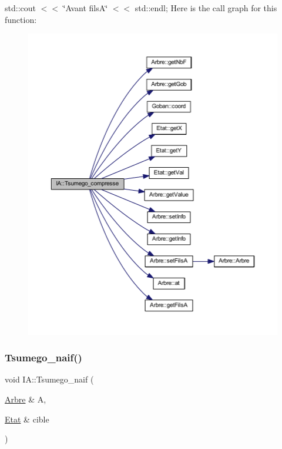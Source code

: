 std\+::cout $<$$<$ \char`\"{}\+Avant fils\+A\char`\"{} $<$$<$ std\+::endl; Here is the call graph for this function\+:
\nopagebreak
\begin{figure}[H]
\begin{center}
\leavevmode
\includegraphics[width=350pt]{class_i_a_a5d86a3548f2410f7fc0676b89d07f4fd_cgraph}
\end{center}
\end{figure}
\mbox{\label{class_i_a_a42202360406fe67babfd01a9b7902fd2}} 
\subsubsection{\texorpdfstring{Tsumego\+\_\+naif()}{Tsumego\_naif()}}
{\footnotesize\ttfamily void I\+A\+::\+Tsumego\+\_\+naif (\begin{DoxyParamCaption}\item[{\hyperlink{class_arbre}{Arbre} \&}]{A,  }\item[{\hyperlink{class_etat}{Etat} \&}]{cible }\end{DoxyParamCaption})\hspace{0.3cm}{\ttfamily [static]}}

